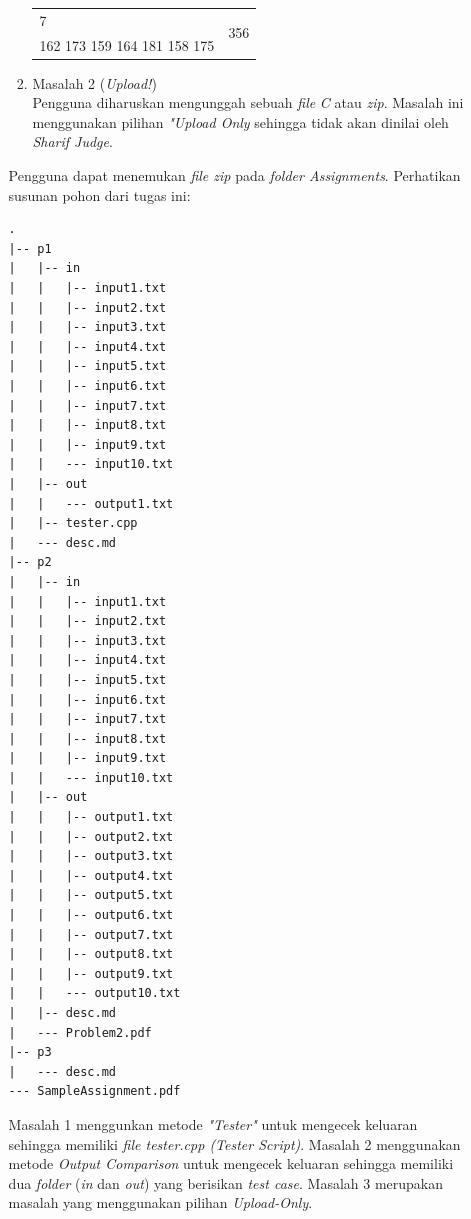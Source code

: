 \documentclass[a4paper,twoside]{article}
\begin{document}
\begin{enumerate}
\begin{enumerate}
\begin{enumerate}
\begin{table}[H]
\begin{tabular}{cc}
						\midrule
						\multicolumn{1}{l}{7} & \multirow{2}{*}{356}\\
						\multicolumn{1}{l}{162 173 159 164 181 158 175} & \\
						
						\bottomrule
						
					\end{tabular} 
				\end{table}
				
				\item Masalah 2 (\textit{Upload!}) \\
				Pengguna diharuskan mengunggah sebuah \textit{file} \textit{C} atau \textit{zip}. Masalah ini menggunakan pilihan \textit{"Upload Only} sehingga tidak akan dinilai oleh \textit{Sharif Judge}.
			\end{enumerate}
			
			Pengguna dapat menemukan \textit{file zip} pada \textit{folder Assignments}. Perhatikan susunan pohon dari tugas ini:
			\begin{lstlisting}[backgroundcolor = \color{lightgray}]
.
|-- p1
|   |-- in
|   |   |-- input1.txt
|   |   |-- input2.txt
|   |   |-- input3.txt
|   |   |-- input4.txt
|   |   |-- input5.txt
|   |   |-- input6.txt
|   |   |-- input7.txt
|   |   |-- input8.txt
|   |   |-- input9.txt
|   |   --- input10.txt
|   |-- out
|   |   --- output1.txt
|   |-- tester.cpp
|   --- desc.md
|-- p2
|   |-- in
|   |   |-- input1.txt
|   |   |-- input2.txt
|   |   |-- input3.txt
|   |   |-- input4.txt
|   |   |-- input5.txt
|   |   |-- input6.txt
|   |   |-- input7.txt
|   |   |-- input8.txt
|   |   |-- input9.txt
|   |   --- input10.txt
|   |-- out
|   |   |-- output1.txt
|   |   |-- output2.txt
|   |   |-- output3.txt
|   |   |-- output4.txt
|   |   |-- output5.txt
|   |   |-- output6.txt
|   |   |-- output7.txt
|   |   |-- output8.txt
|   |   |-- output9.txt
|   |   --- output10.txt
|   |-- desc.md
|   --- Problem2.pdf
|-- p3
|   --- desc.md
--- SampleAssignment.pdf			
			\end{lstlisting}
			Masalah 1 menggunkan metode \textit{"Tester"} untuk mengecek keluaran sehingga memiliki \textit{file tester.cpp (Tester Script)}. Masalah 2 menggunakan metode \textit{Output Comparison} untuk mengecek keluaran sehingga memiliki dua \textit{folder} (\textit{in} dan \textit{out}) yang berisikan \textit{test case}. Masalah 3 merupakan masalah yang menggunakan pilihan \textit{Upload-Only}.
			

\end{enumerate}
\end{enumerate}
\end{document}
